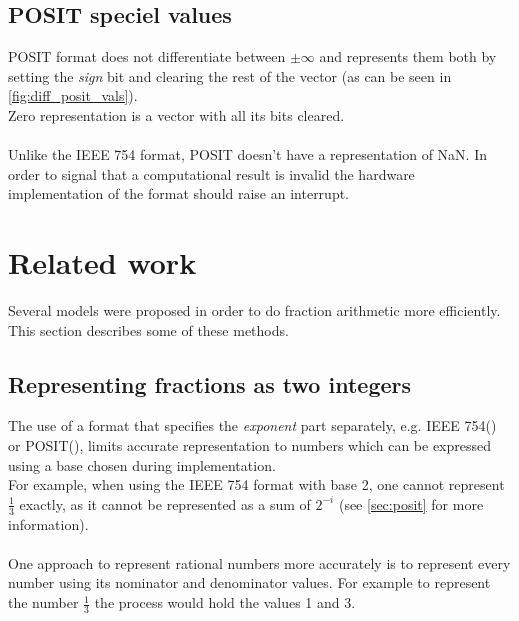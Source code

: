 \documentclass[10pt]{article}
\begin{document}
\subsection{POSIT speciel values}\label{sec:posit-speciel-values}

POSIT format does not differentiate between $\pm\infty$ and represents them both
by setting the \textit{sign} bit and clearing the rest of the vector (as can be
seen in \autoref{fig:diff_posit_vals}). \\
Zero representation is a vector with all its bits cleared.

\paragraph{}
Unlike the IEEE 754 format, POSIT doesn't have a representation of NaN. In order
to signal that a computational result is invalid the hardware implementation of
the format should raise an interrupt.

\section{Related work}\label{sec:relatedwork}

Several models were proposed in order to do fraction arithmetic more efficiently.
This section describes some of these methods.

\subsection{Representing fractions as two integers}\label{sec:repr-fract-as}

The use of a format that specifies the \textit{exponent} part separately, e.g.
IEEE 754() or POSIT(), limits accurate
representation to numbers which can be expressed using a base chosen during implementation.\\ For example,
when using the IEEE 754 format with base 2, one cannot represent $\frac{1}{3}$
exactly, as it cannot be represented as a sum of $2^{-i}$ (see
\autoref{sec:posit} for more information).

\paragraph{}
One approach to represent rational numbers more accurately is to represent every
number using its nominator and denominator values. For example to represent the
number $\frac{1}{3}$ the process would hold the values 1 and 3.
\end{document}

